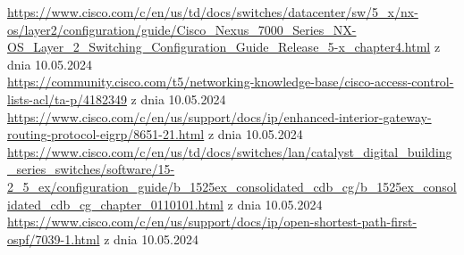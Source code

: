 \documentclass[polish,12pt,twoside,a4paper]{report}
\begin{document}




\newpage

\newpage

\newpage

\newpage

\begin{thebibliography}{6}

 \url{https://www.cisco.com/c/en/us/td/docs/switches/datacenter/sw/5_x/nx-os/layer2/configuration/guide/Cisco_Nexus_7000_Series_NX-OS_Layer_2_Switching_Configuration_Guide_Release_5-x_chapter4.html} z dnia 10.05.2024 \\
 \url{https://community.cisco.com/t5/networking-knowledge-base/cisco-access-control-lists-acl/ta-p/4182349} z dnia 10.05.2024 \\
 \url{https://www.cisco.com/c/en/us/support/docs/ip/enhanced-interior-gateway-routing-protocol-eigrp/8651-21.html} z dnia 10.05.2024 \\
 \url{https://www.cisco.com/c/en/us/td/docs/switches/lan/catalyst_digital_building_series_switches/software/15-2_5_ex/configuration_guide/b_1525ex_consolidated_cdb_cg/b_1525ex_consolidated_cdb_cg_chapter_0110101.html} z dnia 10.05.2024 \\
 \url{https://www.cisco.com/c/en/us/support/docs/ip/open-shortest-path-first-ospf/7039-1.html} z dnia 10.05.2024 \\
\end{thebibliography}
\newpage
\end{document}
